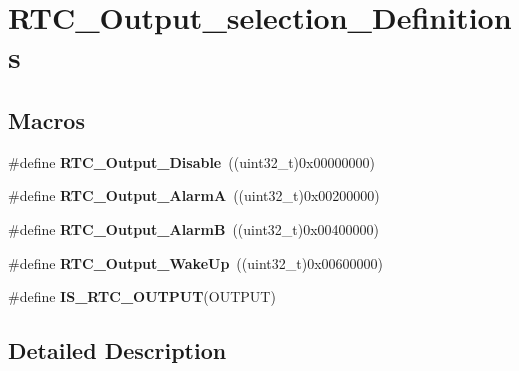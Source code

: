 \hypertarget{group___r_t_c___output__selection___definitions}{}\section{R\+T\+C\+\_\+\+Output\+\_\+selection\+\_\+\+Definitions}
\label{group___r_t_c___output__selection___definitions}
\subsection*{Macros}
\begin{DoxyCompactItemize}
\item 
\hypertarget{group___r_t_c___output__selection___definitions_gac822a3040c6e8a503118bba51593e489}{}\#define {\bfseries R\+T\+C\+\_\+\+Output\+\_\+\+Disable}~((uint32\+\_\+t)0x00000000)\label{group___r_t_c___output__selection___definitions_gac822a3040c6e8a503118bba51593e489}

\item 
\hypertarget{group___r_t_c___output__selection___definitions_ga56386ce37ad43c8b09a07437fa248483}{}\#define {\bfseries R\+T\+C\+\_\+\+Output\+\_\+\+Alarm\+A}~((uint32\+\_\+t)0x00200000)\label{group___r_t_c___output__selection___definitions_ga56386ce37ad43c8b09a07437fa248483}

\item 
\hypertarget{group___r_t_c___output__selection___definitions_ga7fecea40e71cbadf6821bb5cc9f24e39}{}\#define {\bfseries R\+T\+C\+\_\+\+Output\+\_\+\+Alarm\+B}~((uint32\+\_\+t)0x00400000)\label{group___r_t_c___output__selection___definitions_ga7fecea40e71cbadf6821bb5cc9f24e39}

\item 
\hypertarget{group___r_t_c___output__selection___definitions_ga1a48ec12a6fc320c8e18cc0f3c89b97a}{}\#define {\bfseries R\+T\+C\+\_\+\+Output\+\_\+\+Wake\+Up}~((uint32\+\_\+t)0x00600000)\label{group___r_t_c___output__selection___definitions_ga1a48ec12a6fc320c8e18cc0f3c89b97a}

\item 
\#define {\bfseries I\+S\+\_\+\+R\+T\+C\+\_\+\+O\+U\+T\+P\+U\+T}(O\+U\+T\+P\+U\+T)
\end{DoxyCompactItemize}


\subsection{Detailed Description}


